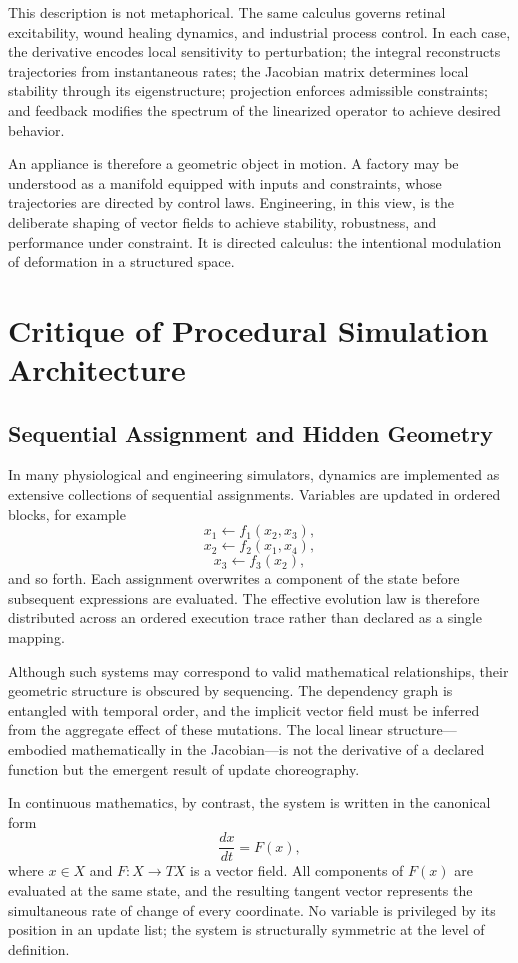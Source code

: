 \documentclass[12pt]{book}
\begin{document}
This description is not metaphorical. The same calculus governs retinal
excitability, wound healing dynamics, and industrial process control.
In each case, the derivative encodes local sensitivity to perturbation;
the integral reconstructs trajectories from instantaneous rates; the
Jacobian matrix determines local stability through its eigenstructure;
projection enforces admissible constraints; and feedback modifies the
spectrum of the linearized operator to achieve desired behavior.

An appliance is therefore a geometric object in motion. A factory may
be understood as a manifold equipped with inputs and constraints,
whose trajectories are directed by control laws. Engineering, in this
view, is the deliberate shaping of vector fields to achieve stability,
robustness, and performance under constraint. It is directed calculus:
the intentional modulation of deformation in a structured space.

\chapter{Critique of Procedural Simulation Architecture}

\section{Sequential Assignment and Hidden Geometry}

In many physiological and engineering simulators, dynamics are implemented as extensive collections of sequential assignments. Variables are updated in ordered blocks, for example
\[
x_1 \leftarrow f_1(x_2, x_3),
\]
\[
x_2 \leftarrow f_2(x_1, x_4),
\]
\[
x_3 \leftarrow f_3(x_2),
\]
and so forth. Each assignment overwrites a component of the state before subsequent expressions are evaluated. The effective evolution law is therefore distributed across an ordered execution trace rather than declared as a single mapping.

Although such systems may correspond to valid mathematical relationships, their geometric structure is obscured by sequencing. The dependency graph is entangled with temporal order, and the implicit vector field must be inferred from the aggregate effect of these mutations. The local linear structure---embodied mathematically in the Jacobian---is not the derivative of a declared function but the emergent result of update choreography.

In continuous mathematics, by contrast, the system is written in the canonical form
\[
\frac{dx}{dt} = F(x),
\]
where $x \in X$ and $F : X \to TX$ is a vector field. All components of $F(x)$ are evaluated at the same state, and the resulting tangent vector represents the simultaneous rate of change of every coordinate. No variable is privileged by its position in an update list; the system is structurally symmetric at the level of definition.
\end{document}
